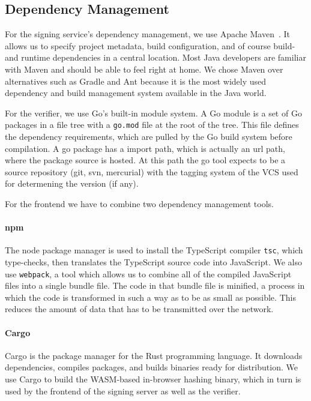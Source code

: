 \subsection{Dependency Management}\label{subsec:dependency-management}
For the signing service's dependency management,
we use Apache Maven~\cite{mvn}.
It allows us to specify project metadata,
build configuration,
and of course build- and runtime dependencies in a central location.
Most Java developers are familiar with Maven and should be able to feel right at home.
We chose Maven over alternatives such as Gradle and Ant because it is the most widely used dependency and build management system available in the Java world.

For the verifier,
we use Go's built-in module system.
A Go module is a set of Go packages in a file tree with a \texttt{go.mod} file at the root of the tree.
This file defines the dependency requirements,
which are pulled by the Go build system before compilation.
A go package has a import path, which is actually an url path, where the package source is hosted.
At this path the go tool expects to be a source repository (git, svn, mercurial) with the tagging system of the \gls{VCS} used for determening the version (if any).

For the frontend we have to combine two dependency management tools.
\paragraph{npm} The node package manager is used to install the TypeScript compiler \texttt{tsc},
which type-checks, then translates the TypeScript source code into JavaScript.
We also use \texttt{webpack},
a tool which allows us to combine all of the compiled JavaScript files into a single bundle file.
The code in that bundle file is minified,
a process in which the code is transformed in such a way as to be as small as possible.
This reduces the amount of data that has to be transmitted over the network.

\paragraph{Cargo} Cargo is the package manager for the Rust programming language.
It downloads dependencies, compiles packages,
and builds binaries ready for distribution.
We use Cargo to build the \gls{WASM}-based in-browser hashing binary,
which in turn is used by the frontend of the signing server as well as the verifier.

